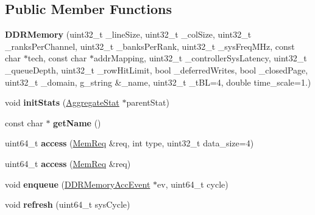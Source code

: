 \subsection*{Public Member Functions}
\begin{DoxyCompactItemize}
\item 
\hypertarget{classDDRMemory_aa395b8a32cf5406305897e0610522778}{{\bfseries D\-D\-R\-Memory} (uint32\-\_\-t \-\_\-line\-Size, uint32\-\_\-t \-\_\-col\-Size, uint32\-\_\-t \-\_\-ranks\-Per\-Channel, uint32\-\_\-t \-\_\-banks\-Per\-Rank, uint32\-\_\-t \-\_\-sys\-Freq\-M\-Hz, const char $\ast$tech, const char $\ast$addr\-Mapping, uint32\-\_\-t \-\_\-controller\-Sys\-Latency, uint32\-\_\-t \-\_\-queue\-Depth, uint32\-\_\-t \-\_\-row\-Hit\-Limit, bool \-\_\-deferred\-Writes, bool \-\_\-closed\-Page, uint32\-\_\-t \-\_\-domain, g\-\_\-string \&\-\_\-name, uint32\-\_\-t \-\_\-t\-B\-L=4, double time\-\_\-scale=1.)}\label{classDDRMemory_aa395b8a32cf5406305897e0610522778}

\item 
\hypertarget{classDDRMemory_a58c0d5633d6ada4c71d06a452ca716a1}{void {\bfseries init\-Stats} (\hyperlink{classAggregateStat}{Aggregate\-Stat} $\ast$parent\-Stat)}\label{classDDRMemory_a58c0d5633d6ada4c71d06a452ca716a1}

\item 
\hypertarget{classDDRMemory_a0755b4e9f98c10e62c437ae7d7111c0a}{const char $\ast$ {\bfseries get\-Name} ()}\label{classDDRMemory_a0755b4e9f98c10e62c437ae7d7111c0a}

\item 
\hypertarget{classDDRMemory_a2f25f7e10c2687de33715398b71b2f3b}{uint64\-\_\-t {\bfseries access} (\hyperlink{structMemReq}{Mem\-Req} \&req, int type, uint32\-\_\-t data\-\_\-size=4)}\label{classDDRMemory_a2f25f7e10c2687de33715398b71b2f3b}

\item 
\hypertarget{classDDRMemory_a1bc441f6c27aa782f6c10ffcc44a74aa}{uint64\-\_\-t {\bfseries access} (\hyperlink{structMemReq}{Mem\-Req} \&req)}\label{classDDRMemory_a1bc441f6c27aa782f6c10ffcc44a74aa}

\item 
\hypertarget{classDDRMemory_a749d93a0a63f591c794c9718da692c8f}{void {\bfseries enqueue} (\hyperlink{classDDRMemoryAccEvent}{D\-D\-R\-Memory\-Acc\-Event} $\ast$ev, uint64\-\_\-t cycle)}\label{classDDRMemory_a749d93a0a63f591c794c9718da692c8f}

\item 
\hypertarget{classDDRMemory_a3f20a7e4a2d31a9220f3da4b39f84768}{void {\bfseries refresh} (uint64\-\_\-t sys\-Cycle)}\label{classDDRMemory_a3f20a7e4a2d31a9220f3da4b39f84768}


\end{DoxyCompactItemize}
